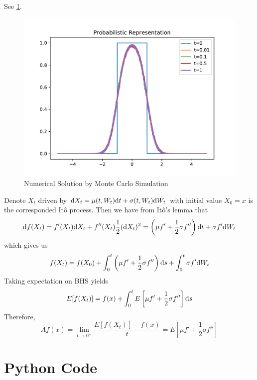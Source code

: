 \documentclass{homework}
\begin{document}
\begin{subproblem}
        \item
        See \cref{fig:prob sol}.
        \begin{figure}[h]
            \centering
            \includegraphics[width=\textwidth]{prob-sol}
            \caption{Numerical Solution by Monte Carlo Simulation}
            \label{fig:prob sol}
        \end{figure}
    \end{subproblem}

    \problem
    Denote $X_t$ driven by $\mathrm d X_t=\mu(t,W_t)\mathrm d t+\sigma(t,W_t)\mathrm d W_t$
    with initial value $X_0=x$
    is the corresponded It\^o process. Then we have from It\^o's lemma
    that
    \[\mathrm d f(X_t)=f'(X_t)\mathrm d X_t+f''(X_t)\frac{1}{2}(\mathrm d X_t)^2
    =\left(\mu f'+\frac{1}{2}\sigma f''\right)\mathrm d t+\sigma f'\mathrm d W_t\]
    which gives us
    \[f(X_t)=f(X_0)+\int_0^t\left(\mu f'+\frac{1}{2}\sigma f''\right)\mathrm d s
    +\int_0^t\sigma f'\mathrm d W_s\]
    Taking expectation on BHS yields
    \[E[f(X_t)]=f(x)+\int_0^tE\left[\mu f'+\frac{1}{2}\sigma f''\right]\mathrm d s\]
    Therefore,
    \[Af(x)=\lim_{t\to 0^+}\frac{E[f(X_t)]-f(x)}{t}
    =E\left[\mu f'+\frac{1}{2}\sigma f''\right]\]


    \appendix
    \section{Python Code}
    
\end{document}
